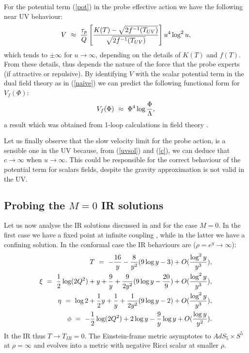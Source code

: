 \documentclass[a4paper,12pt]{article}
\def\half{{1 \over 2}}
\begin{document}
For the potential term (\ref{pot}) in the probe effective action we have the following near UV behaviour:
\begin{equation}
V~\approx~ {\tau_{p}\over Q}\left[{{K(T)-\sqrt{2f^{-1}(T_{UV})}}\over\sqrt{2f^{-1}(T_{UV})}}\right] u^4\log^2u,
\end{equation}
which tends to $\pm\infty$ for $u\rightarrow\infty$, depending on the details of $K(T)$ and $f(T)$. From these details, thus depends the nature of the force that the probe experts (if attractive or repulsive).
By identifying $V$ with the scalar potential term in the dual field theory as in (\ref{naive}) we can predict the following functional form for $V_f(\Phi)$:
\begin{equation}
V_f(\Phi)~\approx~ \Phi^4\log{\Phi\over\Lambda},
\end{equation}
a result which  was obtained from 1-loop calculations in field theory \cite{z}.

Let us finally observe that the slow velocity limit  for the probe action, is a sensible
one in the UV because, from (\ref{uvsol}) and (\ref{c}), we can deduce that $c\rightarrow\infty$ when $u\rightarrow\infty$. This could be responsible for the correct behaviour of the potential term for scalars fields, despite the gravity approximation is not valid in the UV.


\subsection{Probing the $M=0$ IR solutions}

 Let us now analyse the IR solutions discussed in \cite{kt0} and \cite{minahan} for the case $M=0$.
In the first case we have a fixed point at infinite coupling , while in the latter we have a confining solution.
In the conformal case \cite{kt0} the IR behaviours are ($\rho=e^y \rightarrow \infty$):
\begin{eqnarray}
T~=~ - {16\over y}
 -  {  8\over y^2}   ( 9 \log y  - 3) + O ( { \log^2 y \over y^3}), \nonumber\\  
\xi~ =~  \half \log (2 Q^2)  +  y   +    {9\over y}
 +   {  9\over 2 y^2}   ( 9 \log y  - {20\over 9}
) + O ( { \log^2 y \over y^3}), \nonumber\\
\eta~=~ \log 2  +  \half y   +    {1\over y}
 +  {  1\over 2 y^2}   ( 9 \log y  - 2) + O ( { \log^2 y \over y^3}), \nonumber \\
\phi~=~-{1\over 2}\log(2Q^2) + 2\log y - {9\over y}\log y + O({{\log y}\over y^2}).
\label{ktIR}
\end{eqnarray}
It the IR thus $T\rightarrow T_{IR}=0$. The Einstein-frame metric  
asymptotes to $AdS_5 \times S^5$  at $\rho=\infty$
and evolves into a metric with negative Ricci scalar at smaller $\rho$.
\end{document}
